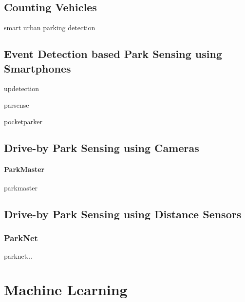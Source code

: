 \subsection{Counting Vehicles}
\label{sec:counting_in_out_park_sensing}
smart urban parking detection \cite{smarturbanparkingdetection}

\subsection{Event Detection based Park Sensing using Smartphones}
\label{sec:event_detection_park_sensing}

updetection\cite{Ma:2014:USP:2674918.2674929}

parsense \cite{Nawaz:2013:PSB:2500423.2500438}

pocketparker \cite{Nandugudi:2014:PPP:2632048.2632098}

\subsection{Drive-by Park Sensing using Cameras}
\label{sec:related_driveby_park_sensing_cameras}

\paragraph{ParkMaster}
 
parkmaster \cite{Grassi:2017:PIE:3132211.3134452}


\subsection{Drive-by Park Sensing using Distance Sensors}
\label{sec:related_driveby_park_sensing_distance}

\subsubsection{ParkNet}
\label{sec:parknet}

parknet... \cite{Mathur:2010:PDS:1814433.1814448}







\section{Machine Learning}

